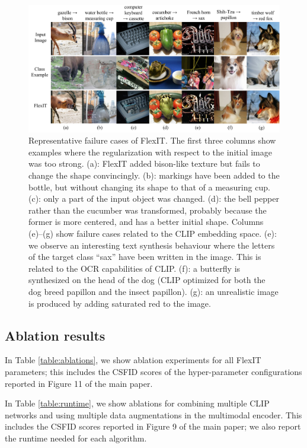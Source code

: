 \begin{figure}[t!]
    \center
    \includegraphics[width=\linewidth]{images/flexit/assets/failures.pdf}
    \caption{
    Representative failure cases of FlexIT. 
    The first three columns show examples where the regularization with respect to the initial image was too strong. (a): FlexIT added bison-like  texture but fails to change  the shape convincingly.
    (b): markings have been added to the  bottle, but without changing its  shape to that  of a measuring cup. 
    (c): only a part of the input object was changed. 
    (d): the bell pepper rather than the cucumber was transformed, probably because the former is more centered, and has a better initial shape. 
    Columns (e)--(g) show failure cases related to the CLIP embedding space. 
    (e): we observe an interesting text synthesis behaviour where the letters of the target class ``sax'' have been written in the image. This is related to the OCR capabilities of CLIP. 
    (f): a butterfly is synthesized on the head of the dog (CLIP optimized for both the dog breed papillon and the insect papillon). 
    (g): an unrealistic image is produced by adding saturated red to the image.
    }
    \label{fig:failures}
\end{figure}


\subsection{Ablation results}
In Table \ref{table:ablations}, we show ablation experiments for all FlexIT parameters; this includes the CSFID scores of the hyper-parameter configurations reported in Figure 11 of the main paper.

In Table \ref{table:runtime}, we show ablations for combining multiple CLIP networks and using multiple data augmentations in the multimodal encoder. This includes the CSFID scores reported in Figure 9 of the main paper; we also report the runtime needed for each algorithm.

